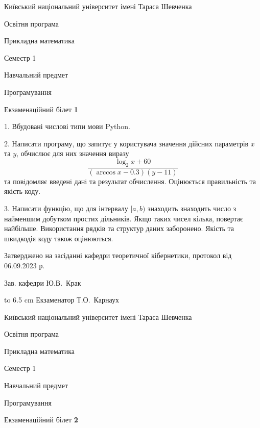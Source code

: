 \documentclass[12pt, ukrainian]{article}
\begin{document}
{{\begin {scriptsize}\par
{ \center  Київський національний університет імені Тараса Шевченка \par}
{\parbox {5 cm}{Освітня програма \hfill}{\parbox {7 cm}{Прикладна математика\hfill}}\parbox {6 cm}{\hfill Семестр 1}}\par
{\parbox {5 cm} {Навчальний предмет \hfill}\parbox {7 cm}{Програмування \hfill}\parbox {6cm}{\hfill}\par}\vspace{-15pt} \end{scriptsize}}{\center Екзаменаційний білет \No \textbf { 1 }\par}}
{%
1. Вбудовані числові типи мови Python.%
\par
2. Написати програму, що запитує у користувача значення дійсних параметрів $x$ та $y$, обчислює для них значення виразу 
$$\frac{\log_{2} x + 60}{(\arccos x - 0.3) (y - 11)}$$ 
та повiдомляє введенi данi та результат обчислення.
 Оцінюється правильність та якість коду.

\par
3. Написати функцію, що для інтервалу $[a, b)$ знаходить знаходить число з найменшим добутком простих дільників. Якщо таких чисел кілька, повертає найбільше.  Використання рядків та структур даних заборонено. Якість та швидкодія коду також оцінюються. 

}
{\smallskip\smallskip \begin {scriptsize} Затверджено на засіданні кафедри теоретичної кібернетики, протокол   від   06.09.2023 р.\par\smallskip\smallskip\smallskip\smallskip
{\parbox {6.5 cm} {Зав. кафедри \dotfill Ю.В.~Крак}}\hspace {0.7cm} {\hbox to 6.5 cm { Екзаменатор \dotfill Т.О.~Карнаух}} \end{scriptsize}}
\vspace{0.9cm}
{{\begin {scriptsize}\par
{ \center  Київський національний університет імені Тараса Шевченка \par}
{\parbox {5 cm}{Освітня програма \hfill}{\parbox {7 cm}{Прикладна математика\hfill}}\parbox {6 cm}{\hfill Семестр 1}}\par
{\parbox {5 cm} {Навчальний предмет \hfill}\parbox {7 cm}{Програмування \hfill}\parbox {6cm}{\hfill}\par}\vspace{-15pt} \end{scriptsize}}{\center Екзаменаційний білет \No \textbf { 2 }\par}}
\end{document}
